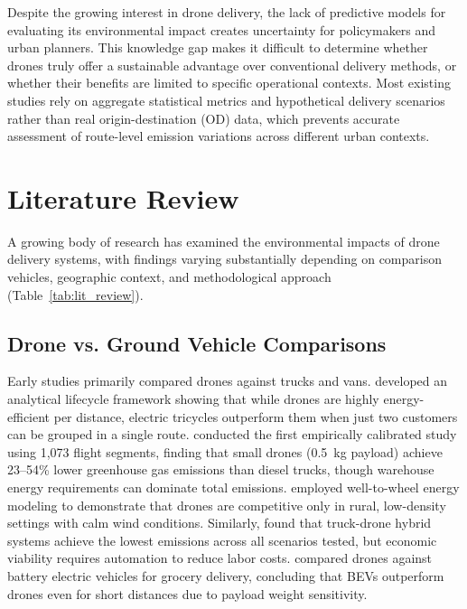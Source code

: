 \documentclass[11pt]{article}
\begin{document}
Despite the growing interest in drone delivery, the lack of predictive models for evaluating its environmental impact creates uncertainty for policymakers and urban planners. This knowledge gap makes it difficult to determine whether drones truly offer a sustainable advantage over conventional delivery methods, or whether their benefits are limited to specific operational contexts. Most existing studies rely on aggregate statistical metrics and hypothetical delivery scenarios rather than real origin-destination (OD) data, which prevents accurate assessment of route-level emission variations across different urban contexts.

\section{Literature Review}

A growing body of research has examined the environmental impacts of drone delivery systems, with findings varying substantially depending on comparison vehicles, geographic context, and methodological approach (Table~\ref{tab:lit_review}).

\subsection{Drone vs. Ground Vehicle Comparisons}

Early studies primarily compared drones against trucks and vans. \textcite{figliozzi_lifecycle_2017} developed an analytical lifecycle framework showing that while drones are highly energy-efficient per distance, electric tricycles outperform them when just two customers can be grouped in a single route. \textcite{stolaroff_energy_2018} conducted the first empirically calibrated study using 1,073 flight segments, finding that small drones (0.5~kg payload) achieve 23--54\% lower greenhouse gas emissions than diesel trucks, though warehouse energy requirements can dominate total emissions. \textcite{kirschstein_comparison_2020} employed well-to-wheel energy modeling to demonstrate that drones are competitive only in rural, low-density settings with calm wind conditions. Similarly, \textcite{baldisseri_truck-based_2022} found that truck-drone hybrid systems achieve the lowest emissions across all scenarios tested, but economic viability requires automation to reduce labor costs. \textcite{yowtak_comparative_2020} compared drones against battery electric vehicles for grocery delivery, concluding that BEVs outperform drones even for short distances due to payload weight sensitivity.
\end{document}
